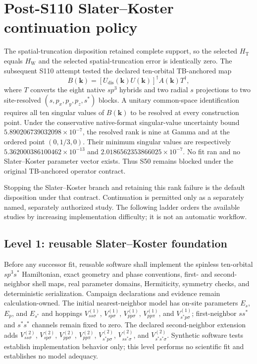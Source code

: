 \documentclass[11pt]{article}
\begin{document}
\section{Post-S110 Slater--Koster continuation policy}

The spatial-truncation disposition retained complete support, so the selected
$H_{\mathrm{T}}$ equals $H_{\mathrm{W}}$ and the selected spatial-truncation error is
identically zero.  The subsequent S110 attempt tested the declared ten-orbital
TB-anchored map
\begin{equation}
 B(\mathbf{k})=
 \left[U_{\mathrm{dis}}(\mathbf{k})U(\mathbf{k})\right]^{\dagger}
 A(\mathbf{k})T^{\dagger},
\end{equation}
where $T$ converts the eight native $sp^3$ hybrids and two radial $s$ projections to
two site-resolved $(s,p_x,p_y,p_z,s^*)$ blocks.  A unitary common-space identification
requires all ten singular values of $B(\mathbf{k})$ to be resolved at every construction
point.  Under the conservative native-format singular-value uncertainty bound
$5.890206739032098\times10^{-7}$, the resolved rank is nine at Gamma and at the ordered
point $(0,1/3,0)$.  Their minimum singular values are respectively
$5.362000386100462\times10^{-13}$ and
$2.0186562353866025\times10^{-7}$.  No fit ran and no Slater--Koster parameter vector
exists.  Thus S50 remains blocked under the original TB-anchored operator contract.

Stopping the Slater--Koster branch and retaining this rank failure is the default
disposition under that contract.  Continuation is permitted only as a separately named,
separately authorized study.  The following ladder orders the available studies by
increasing implementation difficulty; it is not an automatic workflow.

\subsection{Level 1: reusable Slater--Koster foundation}

Before any successor fit, reusable software shall implement the spinless ten-orbital
$sp^3s^*$ Hamiltonian, exact geometry and phase conventions, first- and second-neighbor
shell maps, real parameter domains, Hermiticity, symmetry checks, and deterministic
serialization.  Campaign declarations and evidence remain calculation-owned.  The
initial nearest-neighbor model has on-site parameters $E_s$, $E_p$, and $E_{s^*}$ and
hoppings $V_{ss\sigma}^{(1)}$, $V_{sp\sigma}^{(1)}$,
$V_{pp\sigma}^{(1)}$, $V_{pp\pi}^{(1)}$, and
$V_{s^*p\sigma}^{(1)}$; first-neighbor $ss^*$ and $s^*s^*$ channels remain fixed to
zero.  The declared second-neighbor extension adds
$V_{ss\sigma}^{(2)}$, $V_{sp\sigma}^{(2)}$,
$V_{pp\sigma}^{(2)}$, $V_{pp\pi}^{(2)}$,
$V_{s^*p\sigma}^{(2)}$, $V_{ss^*\sigma}^{(2)}$, and
$V_{s^*s^*\sigma}^{(2)}$.  Synthetic software tests establish implementation behavior
only; this level performs no scientific fit and establishes no model adequacy.
\end{document}
